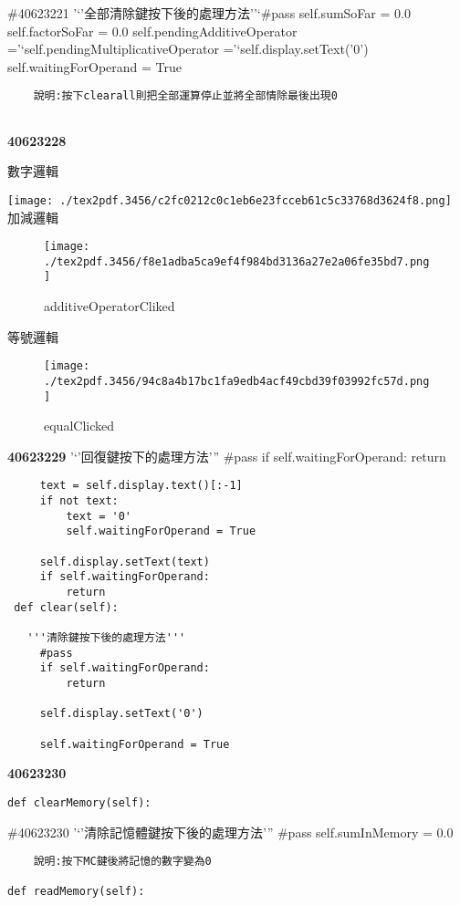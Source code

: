 \documentclass[12pt,,]{report}
\begin{document}
\#40623221 '`'全部清除鍵按下後的處理方法''`\#pass self.sumSoFar = 0.0
self.factorSoFar = 0.0 self.pendingAdditiveOperator
='`self.pendingMultiplicativeOperator ='`self.display.setText('0')
self.waitingForOperand = True

\begin{verbatim}
    說明:按下clearall則把全部運算停止並將全部情除最後出現0
    
\end{verbatim}

\textbf{40623228}

數字邏輯

\texttt{[image: ./tex2pdf.3456/c2fc0212c0c1eb6e23fcceb61c5c33768d3624f8.png]}
加減邏輯

\begin{figure}
\centering
\texttt{[image: ./tex2pdf.3456/f8e1adba5ca9ef4f984bd3136a27e2a06fe35bd7.png]}
\caption{additiveOperatorCliked\label{fig:additiveOperatorCliked}}
\end{figure}

等號邏輯

\begin{figure}
\centering
\texttt{[image: ./tex2pdf.3456/94c8a4b17bc1fa9edb4acf49cbd39f03992fc57d.png]}
\caption{equalClicked\label{fig:equalClicked}}
\end{figure}

\textbf{40623229} '`'回復鍵按下的處理方法''' \#pass if
self.waitingForOperand: return

\begin{verbatim}
     text = self.display.text()[:-1]
     if not text:
         text = '0'
         self.waitingForOperand = True

     self.display.setText(text)
     if self.waitingForOperand:
         return
 def clear(self):
  
   '''清除鍵按下後的處理方法'''
     #pass
     if self.waitingForOperand:
         return

     self.display.setText('0')
     
     self.waitingForOperand = True
\end{verbatim}

\textbf{40623230}

\begin{verbatim}
def clearMemory(self):
\end{verbatim}

\#40623230 '`'清除記憶體鍵按下後的處理方法''' \#pass self.sumInMemory =
0.0

\begin{verbatim}
    說明:按下MC鍵後將記憶的數字變為0
    
def readMemory(self):
\end{verbatim}
\end{document}
